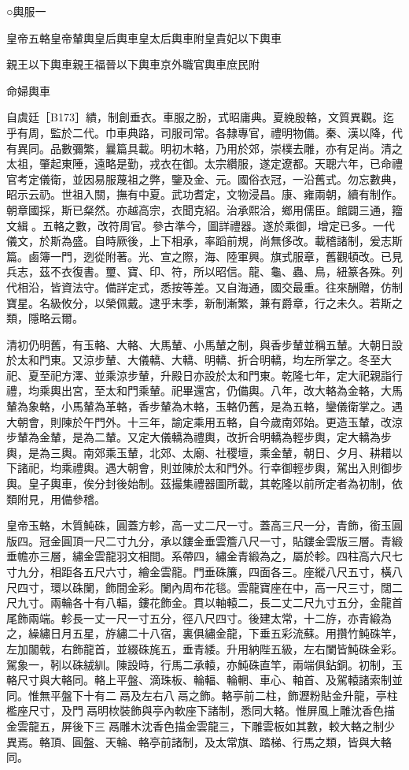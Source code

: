
\begin{pinyinscope}
○輿服一

皇帝五輅皇帝輦輿皇后輿車皇太后輿車附皇貴妃以下輿車

親王以下輿車親王福晉以下輿車京外職官輿車庶民附

命婦輿車

自虞廷［B173］繢，制創垂衣。車服之朌，式昭庸典。夏絻殷輅，文質異觀。迄乎有周，監於二代。巾車典路，司服司常。各隸專官，禮明物備。秦、漢以降，代有異同。品數彌繁，曩篇具載。明初木輅，乃用於郊，崇樸去雕，亦有足尚。清之太祖，肇起東陲，遠略是勤，戎衣在御。太宗纘服，遂定遼都。天聰六年，已命禮官考定儀衛，並因易服蔑祖之弊，鑒及金、元。國俗衣冠，一沿舊式。勿忘數典，昭示云礽。世祖入關，撫有中夏。武功耆定，文物浸昌。康、雍兩朝，續有制作。朝章國採，斯已粲然。亦越高宗，衣聞克紹。治承熙洽，鄉用儒臣。館闢三通，籀文緝𥮏。五輅之數，改符周官。參古準今，圖詳禮器。遂於乘御，增定已多。一代儀文，於斯為盛。自時厥後，上下相承，率蹈前規，尚無侈改。載稽諸制，爰志斯篇。鹵簿一門，迾從附著。光、宣之際，海、陸軍興。旗式服章，舊觀頓改。已見兵志，茲不衣復書。璽、寶、印、符，所以昭信。龍、龜、蟲、鳥，紐篆各殊。列代相沿，皆資法守。備詳定式，悉按等差。又自海通，國交最重。往來酬贈，仿制寶星。名級攸分，以榮佩戴。逮乎末季，新制漸繁，兼有爵章，行之未久。若斯之類，隱略云爾。

清初仍明舊，有玉輅、大輅、大馬輦、小馬輦之制，與香步輦並稱五輦。大朝日設於太和門東。又涼步輦、大儀轎、大轎、明轎、折合明轎，均左所掌之。冬至大祀、夏至祀方澤、並乘涼步輦，升殿日亦設於太和門東。乾隆七年，定大祀親詣行禮，均乘輿出宮，至太和門乘輦。祀畢還宮，仍備輿。八年，改大輅為金輅，大馬輦為象輅，小馬輦為革輅，香步輦為木輅，玉輅仍舊，是為五輅，鑾儀衛掌之。遇大朝會，則陳於午門外。十三年，諭定乘用五輅，自今歲南郊始。更造玉輦，改涼步輦為金輦，是為二輦。又定大儀轎為禮輿，改折合明轎為輕步輿，定大轎為步輿，是為三輿。南郊乘玉輦，北郊、太廟、社稷壇，乘金輦，朝日、夕月、耕耤以下諸祀，均乘禮輿。遇大朝會，則並陳於太和門外。行幸御輕步輿，駕出入則御步輿。皇子輿車，俟分封後始制。茲撮集禮器圖所載，其乾隆以前所定者為初制，依類附見，用備參稽。

皇帝玉輅，木質魨硃，圓蓋方軫，高一丈二尺一寸。蓋高三尺一分，青飾，銜玉圓版四。冠金圓頂一尺二寸九分，承以鏤金垂雲簷八尺一寸，貼鏤金雲版三層。青緞垂幨亦三層，繡金雲龍羽文相間。系帶四，繡金青緞為之，屬於軫。四柱高六尺七寸九分，相距各五尺六寸，繪金雲龍。門垂硃簾，四面各三。座縱八尺五寸，橫八尺四寸，環以硃闌，飾間金彩。闌內周布花毯。雲龍寶座在中，高一尺三寸，闊二尺九寸。兩輪各十有八輻，鏤花飾金。貫以軸轅二，長二丈二尺九寸五分，金龍首尾飾兩端。軫長一丈一尺一寸五分，徑八尺四寸。後建太常，十二斿，亦青緞為之，繰繡日月五星，斿繡二十八宿，裏俱繡金龍，下垂五彩流蘇。用攢竹魨硃竿，左加闟戟，右飾龍首，並綴硃旄五，垂青緌。升用納陛五級，左右闌皆魨硃金彩。駕象一，靷以硃絨紃。陳設時，行馬二承轅，亦魨硃直竿，兩端俱鉆銅。初制，玉輅尺寸與大輅同。輅上平盤、滴珠板、輪輻、輪輞、車心、軸首、及駕轅諸索制並同。惟無平盤下十有二鬲及左右八鬲之飾。輅亭前二柱，飾瀝粉貼金升龍，亭柱檻座尺寸，及門鬲明栨裝飾與亭內軟座下諸制，悉同大輅。惟屏風上雕沈香色描金雲龍五，屏後下三鬲雕木沈香色描金雲龍三，下雕雲板如其數，較大輅之制少異焉。輅頂、圓盤、天輪、輅亭前諸制，及太常旗、踏梯、行馬之類，皆與大輅同。


\end{pinyinscope}
